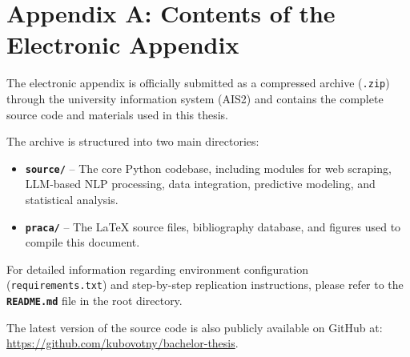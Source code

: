 \chapter*{Appendix A: Contents of the Electronic Appendix}

The electronic appendix is officially submitted as a compressed archive (\texttt{.zip}) through the university information system (AIS2) and contains the complete source code and materials used in this thesis.

The archive is structured into two main directories:
\begin{itemize}
    \item \textbf{\texttt{source/}} -- The core Python codebase, including modules for web scraping, LLM-based NLP processing, data integration, predictive modeling, and statistical analysis.
    \item \textbf{\texttt{praca/}} -- The \LaTeX{} source files, bibliography database, and figures used to compile this document.
\end{itemize}

For detailed information regarding environment configuration (\texttt{requirements.txt}) and step-by-step replication instructions, please refer to the \textbf{\texttt{README.md}} file in the root directory.

The latest version of the source code is also publicly available on GitHub at: \\ 
\url{https://github.com/kubovotny/bachelor-thesis}.